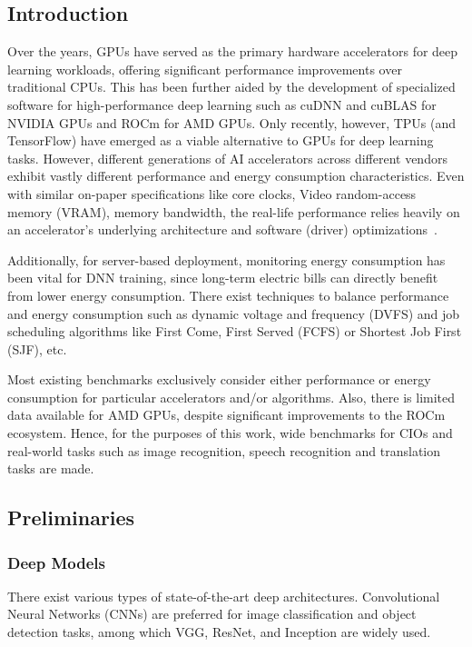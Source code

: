 \subsection{Introduction}
\label{subsec:introduction3}

Over the years, GPUs have served as the primary hardware accelerators for deep learning workloads,
offering significant performance improvements over traditional CPUs.
This has been further aided by the development of specialized software for high-performance deep learning such as cuDNN and cuBLAS for NVIDIA GPUs and ROCm for AMD GPUs.
Only recently, however, TPUs (and TensorFlow) have emerged as a viable alternative to GPUs for deep learning tasks.
However,
different generations of AI accelerators across different vendors exhibit vastly different performance and energy consumption characteristics.
Even with similar on-paper specifications like core clocks, Video random-access memory (VRAM), memory bandwidth,
the real-life performance relies heavily on an accelerator's underlying architecture and
software (driver) optimizations~\cite{b8}.

Additionally, for server-based deployment,
monitoring energy consumption has been vital for DNN training,
since long-term electric bills can directly benefit from lower energy consumption.
There exist techniques to balance performance and energy consumption such as dynamic voltage and frequency
(DVFS) and job scheduling algorithms like First Come, First Served (FCFS) or Shortest Job First (SJF)\cite{b2}, etc.

Most existing benchmarks exclusively consider either performance or energy consumption for particular accelerators and/or algorithms.
Also, there is limited data available for AMD GPUs, despite significant improvements to the ROCm ecosystem.
Hence, for the purposes of this work,
wide benchmarks for CIOs and real-world tasks such as image recognition,
speech recognition and translation tasks are made.

\subsection{Preliminaries}
\label{subsec:prelims}

\subsubsection{Deep Models}
There exist various types of state-of-the-art deep architectures.
Convolutional Neural Networks (CNNs) are preferred for image classification and object detection tasks,
among which VGG, ResNet, and Inception are widely used.

